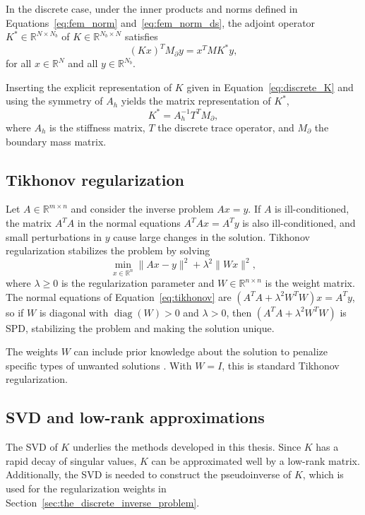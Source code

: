 In the discrete case, under the inner products and norms defined in Equations~\eqref{eq:fem_norm} and~\eqref{eq:fem_norm_ds}, the adjoint operator $K^* \in \mathbb{R}^{N \times N_b}$ of $K \in \mathbb{R}^{N_b \times N}$ satisfies
\begin{equation}\label{eq:K_star_def}
    (K x)^T M_\partial y = x^T M K^* y,
\end{equation}
for all $x \in \mathbb R^N$ and all $y \in \mathbb R^{N_b}$.
%

Inserting the explicit representation of $K$ given in Equation~\eqref{eq:discrete_K} and using the symmetry of $A_h$ yields the matrix representation of $K^*$,
\begin{equation}\label{eq:discrete_K_star}
    K^* = A_h^{-1} T^T M_\partial,
\end{equation}
where $A_h$ is the stiffness matrix, $T$ the discrete trace operator, and $M_\partial$ the boundary mass matrix.


\subsection{Tikhonov regularization}
Let $A \in \mathbb{R}^{m \times n}$ and consider the inverse problem $Ax = y$. If $A$ is ill-conditioned, the matrix $A^T A$ in the normal equations $A^T A x = A^T y$ is also ill-conditioned, and small perturbations in $y$ 
cause large changes in the solution. Tikhonov regularization stabilizes the problem by solving
\begin{equation}\label{eq:tikhonov}
    \min_{x \in \mathbb{R}^n}
    \|Ax - y\|^2 + \lambda^2 \|Wx\|^2,
\end{equation}
where $\lambda \ge 0$ is the regularization parameter and $W \in \mathbb{R}^{n \times n}$ is the weight matrix. The normal equations of Equation~\eqref{eq:tikhonov} are $(A^T A + \lambda^2 W^T W) x = A^T y$, so if $W$ is diagonal with $\operatorname{diag}(W) > 0$ and $\lambda > 0$, then $(A^T A + \lambda^2 W^T W)$ is SPD, stabilizing the problem and making the solution unique.

The weights $W$ can include prior knowledge about the solution to penalize specific types of unwanted solutions \cite{hansen2010discrete}. With $W = I$, this is standard Tikhonov regularization.
%
%


\subsection{SVD and low-rank approximations}
The SVD of $K$ underlies the methods developed in this thesis. Since $K$ has a rapid decay of singular values, $K$ can be approximated well by a low-rank matrix. Additionally, the SVD is needed to construct the pseudoinverse of $K$, which is used for the regularization weights in Section~\ref{sec:the_discrete_inverse_problem}.

